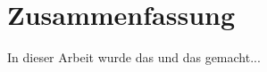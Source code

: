 
\chapter{Zusammenfassung} %

\label{Kapitel6} %


In dieser Arbeit wurde das und das gemacht...





